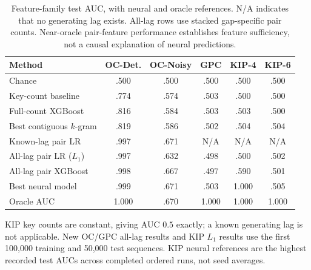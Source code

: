 \begin{table}[htbp]
\centering\small
\caption{Feature-family test AUC, with neural and oracle references.
N/A indicates that no generating lag exists. All-lag rows use
stacked gap-specific pair counts. Near-oracle pair-feature performance
establishes feature sufficiency, not a causal explanation of neural predictions.}
\label{tab:signal_decomposition}
\begin{tabular}{lccccc}
\toprule
Method & OC-Det. & OC-Noisy & GPC & KIP-4 & KIP-6 \\
\midrule
Chance & .500 & .500 & .500 & .500 & .500 \\
Key-count baseline & .774 & .574 & .503 & .500 & .500 \\
Full-count XGBoost & .816 & .584 & .503 & .503 & .500 \\
Best contiguous \(k\)-gram & .819 & .586 & .502 & .504 & .504 \\
Known-lag pair LR & .997 & .671 & N/A & N/A & N/A \\
All-lag pair LR ($L_1$) & .997 & .632 & .498 & .500 & .502 \\
All-lag pair XGBoost & .998 & .667 & .497 & .590 & .501 \\
Best neural model & .999 & .671 & .503 & 1.000 & .505 \\
Oracle AUC & 1.000 & .670 & 1.000 & 1.000 & 1.000 \\
\bottomrule
\end{tabular}
\par\smallskip
\begin{minipage}{\linewidth}
\footnotesize
KIP key counts are constant, giving AUC $0.5$ exactly; a known generating
lag is not applicable. New OC/GPC all-lag results and KIP $L_1$ results use the first
100,000 training and 50,000 test sequences. KIP neural references are the highest recorded test AUCs
across completed ordered runs, not seed averages.
\end{minipage}
\end{table}
